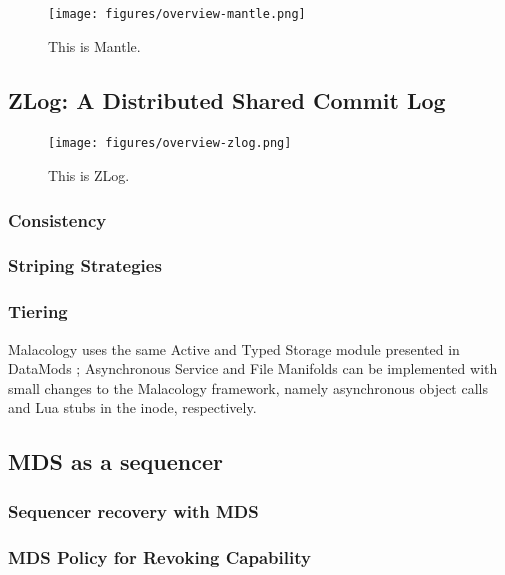 \documentclass[10pt,twocolumn]{article}
\begin{document}
\begin{figure}[htbp]
\centering
\texttt{[image: figures/overview-mantle.png]}
\caption{This is Mantle.}
\end{figure}

\subsection{ZLog: A Distributed Shared Commit
Log}\label{zlog-a-distributed-shared-commit-log}

\begin{figure}[htbp]
\centering
\texttt{[image: figures/overview-zlog.png]}
\caption{This is ZLog.}
\end{figure}

\subsubsection{Consistency}\label{consistency}

\subsubsection{Striping Strategies}\label{striping-strategies}

\subsubsection{Tiering}\label{tiering}

Malacology uses the same Active and Typed Storage module presented in
DataMods \autocite{watkins_datamods_2012}; Asynchronous Service and File
Manifolds can be implemented with small changes to the Malacology
framework, namely asynchronous object calls and Lua stubs in the inode,
respectively.

\subsection{MDS as a sequencer}\label{mds-as-a-sequencer}

\subsubsection{Sequencer recovery with
MDS}\label{sequencer-recovery-with-mds}

\subsubsection{MDS Policy for Revoking
Capability}\label{mds-policy-for-revoking-capability}
\end{document}
